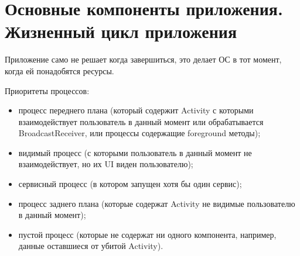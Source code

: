 



\renewcommand\labelitemi{$\bullet$}



\tableofcontents

\newpage
\section{Основные компоненты приложения. Жизненный цикл приложения}

Приложение само не решает когда завершиться, это делает ОС в тот момент, когда ей понадобятся ресурсы.

Приоритеты процессов:
\begin{itemize} 
	\item процесс переднего плана (который содержит Activity с которыми взаимодействует пользователь в данный момент или обрабатывается \\ BroadcastReceiver, или процессы содержащие foreground методы);
	\item видимый процесс (с которыми пользователь в данный момент не взаимодействует, но их UI виден пользователю);
	\item сервисный процесс (в котором запущен хотя бы один сервис);
	\item процесс заднего плана (которые содержат Activity не видимые пользователю в данный момент);
	\item пустой процесс (которые не содержат ни одного компонента, например, данные оставшиеся от убитой Activity).
\end{itemize}

	
	
	 
	
	
	
	
	
	

